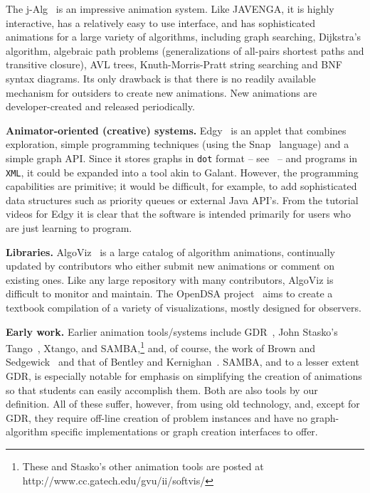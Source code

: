 The j-Alg~\cite{j-Algo} is an impressive animation system.
Like JAVENGA, it is highly interactive, has a relatively easy to use interface, and has sophisticated animations for a large variety of algorithms,
including graph searching, Dijkstra's algorithm,
algebraic path problems (generalizations of all-pairs shortest paths and transitive closure), AVL trees, Knuth-Morris-Pratt string searching and BNF syntax diagrams.
Its only drawback is that there is no readily available mechanism
for outsiders to create new animations.
New animations are developer-created and released periodically.

\textbf{Animator-oriented (creative) systems.}
Edgy~\cite{Edgy} is an applet that combines exploration, simple programming techniques
(using the Snap~\cite{Snap} language) and a simple graph API.
Since it stores graphs in \texttt{dot} format -- see~\cite{GraphViz} --
and programs in \texttt{XML},
it could be expanded into a tool akin to Galant.
However, the programming capabilities are primitive;
it would be difficult, for example, to add sophisticated data structures such as
priority queues or external Java API's.
From the tutorial videos for Edgy it is clear that the software is intended
primarily
for users who are just learning to program.

\textbf{Libraries.}
AlgoViz~\cite{AlgoViz}
is a large catalog of algorithm animations, continually updated by
contributors who either submit new animations or comment on existing ones.
Like any large repository with many contributors, AlgoViz is difficult to
monitor and
maintain.
The OpenDSA project~\cite{%
2012-SIGCSE-Fouh,2011-Koli-Shaffer,2011-ProgramVisualization-Shaffer%
}
aims to create a textbook compilation of a variety of
visualizations, mostly designed for observers.

\textbf{Early work.}
Earlier animation tools/systems include GDR~\cite{1992-CSDM-Stallmann}, John Stasko's
Tango~\cite{1990-Computer-Stasko}, Xtango,
and SAMBA,\footnote{
These and Stasko's other animation tools are posted at
http://www.cc.gatech.edu/gvu/ii/softvis/
} and, of course,
the work of
Brown and Sedgewick~\cite{1988-Computer-Brown,1985-IEEE_Software-Brown}
and that of Bentley and Kernighan~\cite{1987-Animation-Bentley}.
SAMBA, and to a lesser extent GDR, is especially notable for emphasis on simplifying the creation of
animations so that students can easily accomplish them.
Both are also tools by our definition.
All of these suffer, however, from using old technology,
and, except for GDR,
they require off-line creation
of problem instances and have no graph-algorithm specific implementations
or graph creation interfaces to offer.

